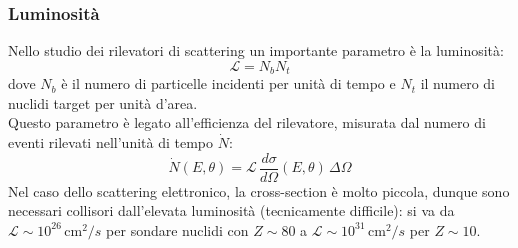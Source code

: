 \subsubsection{Luminosità}

Nello studio dei rilevatori di scattering un importante parametro è la luminosità:
\begin{equation}
	\mathcal{L} = N_b N_t
	\label{eq:15}
\end{equation}
dove $ N_b $ è il numero di particelle incidenti per unità di tempo e $ N_t $ il numero di nuclidi target per unità d'area.\\
Questo parametro è legato all'efficienza del rilevatore, misurata dal numero di eventi rilevati nell'unità di tempo $ \dot{N} $:
\begin{equation}
	\dot{N} (E, \theta) = \mathcal{L}\, \frac{d\sigma}{d\Omega} (E,\theta) \,\Delta\Omega
	\label{eq:16}
\end{equation}
Nel caso dello scattering elettronico, la cross-section è molto piccola, dunque sono necessari collisori dall'elevata luminosità (tecnicamente difficile): si va da $ \mathcal{L} \sim 10^{26} \,\text{cm}^2 / s $ per sondare nuclidi con $ Z \sim 80 $ a $ \mathcal{L} \sim 10^{31} \,\text{cm}^2 / s $ per $ Z \sim 10 $.










